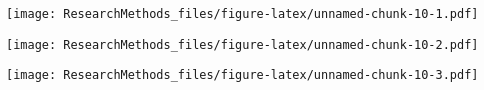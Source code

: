 \documentclass[]{book}
\newenvironment{Shaded}{\begin{snugshade}}{\end{snugshade}}
\newcommand{\KeywordTok}[1]{\textcolor[rgb]{0.13,0.29,0.53}{\textbf{#1}}}
\newcommand{\OperatorTok}[1]{\textcolor[rgb]{0.81,0.36,0.00}{\textbf{#1}}}
\newcommand{\NormalTok}[1]{#1}
\begin{document}
\texttt{[image: ResearchMethods\_files/figure-latex/unnamed-chunk-10-1.pdf]}

\begin{Shaded}
\end{Shaded}

\texttt{[image: ResearchMethods\_files/figure-latex/unnamed-chunk-10-2.pdf]}

\begin{Shaded}
\end{Shaded}

\texttt{[image: ResearchMethods\_files/figure-latex/unnamed-chunk-10-3.pdf]}
\end{document}

